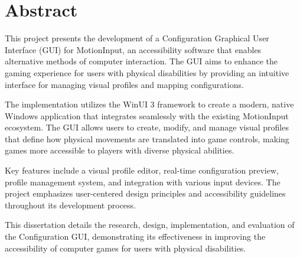 \chapter*{Abstract}

This project presents the development of a Configuration Graphical User Interface (GUI) for MotionInput, an accessibility software that enables alternative methods of computer interaction. The GUI aims to enhance the gaming experience for users with physical disabilities by providing an intuitive interface for managing visual profiles and mapping configurations.

The implementation utilizes the WinUI 3 framework to create a modern, native Windows application that integrates seamlessly with the existing MotionInput ecosystem. The GUI allows users to create, modify, and manage visual profiles that define how physical movements are translated into game controls, making games more accessible to players with diverse physical abilities.

Key features include a visual profile editor, real-time configuration preview, profile management system, and integration with various input devices. The project emphasizes user-centered design principles and accessibility guidelines throughout its development process.

This dissertation details the research, design, implementation, and evaluation of the Configuration GUI, demonstrating its effectiveness in improving the accessibility of computer games for users with physical disabilities.

\clearpage
